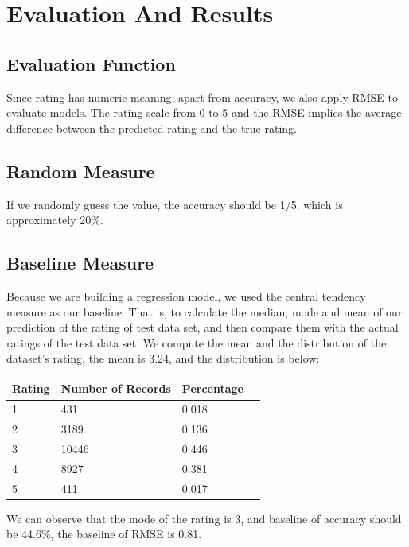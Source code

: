 \documentclass{article}
\begin{document}
\section{Evaluation And Results}

\subsection{Evaluation Function}
Since rating has numeric meaning, apart from accuracy, we also apply RMSE to evaluate models. The rating scale from 0 to 5 and the RMSE implies the average difference between the predicted rating and the true rating.
\subsection{Random Measure}
If we randomly guess the value, the accuracy should be 1/5. which is approximately 20\%.

\subsection{Baseline Measure}
Because we are building a regression model, we used the central tendency measure as our baseline. That is, to calculate the median, mode and mean of our prediction of the rating of test data set, and then compare them with the actual ratings of the test data set.
We compute the mean and the distribution of the dataset's rating, the mean is 3.24, and the distribution is below:
\begin{center}
\begin{tabular}{| l | l | l | l |}
    \hline
Rating & Number of Records & Percentage \\ \hline
1 &431 &0.018  \\ \hline
2 &3189 &0.136  \\ \hline
3 &10446 &0.446  \\ \hline
4 & 8927 &0.381  \\ \hline
5 &411& 0.017  \\ \hline
\end{tabular}
\end{center}

We can observe that the mode of the rating is 3, and baseline of accuracy should be 44.6\%, the baseline of RMSE is 0.81.
\end{document}
